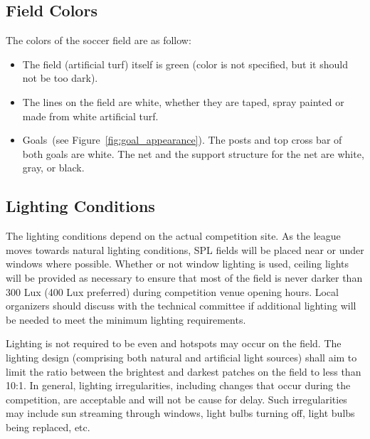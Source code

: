 \documentclass[12pt]{article}
\newcommand{\cf}{see\xspace}
\begin{document}
\subsection{Field Colors}
\label{sec:field_colors}
The colors of the soccer field are as follow:

\begin{itemize}

\item The field (artificial turf) itself is green (color is not specified, but it should not be too dark).

\item The lines on the field are white, whether they are taped, spray painted or made from white artificial turf.

\item Goals~(\cf Figure~\ref{fig:goal_appearance}). The posts and top cross bar of both goals are white. The net and the support structure for the net are white, gray, or black.

\end{itemize}


\subsection{Lighting Conditions}
\label{sec:lightConditions}
The lighting conditions depend on the actual competition site. As the league moves towards natural lighting conditions, SPL fields will be placed near or under windows where possible. Whether or not window lighting is used, ceiling lights will be provided as necessary to ensure that most of the field is never darker than 300 Lux (400 Lux preferred) during competition venue opening hours. Local organizers should discuss with the technical committee if additional lighting will be needed to meet the minimum lighting requirements.

Lighting is not required to be even and hotspots may occur on the field. The lighting design (comprising both natural and artificial light sources) shall aim to limit the ratio between the brightest and darkest patches on the field to less than 10:1. In general, lighting irregularities, including changes that occur during the competition, are acceptable and will not be cause for delay.  Such irregularities may include sun streaming through windows, light bulbs turning off, light bulbs being replaced, etc.
\end{document}
